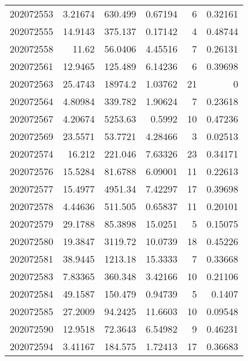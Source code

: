 \begin{tabular}{rrrrrr}
 202072553 &          3.21674 &      630.499  &            0.67194 &           6 & 0.32161 \\
 202072555 &         14.9143  &      375.137  &            0.17142 &           4 & 0.48744 \\
 202072558 &         11.62    &       56.0406 &            4.45516 &           7 & 0.26131 \\
 202072561 &         12.9465  &      125.489  &            6.14236 &           6 & 0.39698 \\
 202072563 &         25.4743  &    18974.2    &            1.03762 &          21 & 0       \\
 202072564 &          4.80984 &      339.782  &            1.90624 &           7 & 0.23618 \\
 202072567 &          4.20674 &     5253.63   &            0.5992  &          10 & 0.47236 \\
 202072569 &         23.5571  &       53.7721 &            4.28466 &           3 & 0.02513 \\
 202072574 &         16.212   &      221.046  &            7.63326 &          23 & 0.34171 \\
 202072576 &         15.5284  &       81.6788 &            6.09001 &          11 & 0.22613 \\
 202072577 &         15.4977  &     4951.34   &            7.42297 &          17 & 0.39698 \\
 202072578 &          4.44636 &      511.505  &            0.65837 &          11 & 0.20101 \\
 202072579 &         29.1788  &       85.3898 &           15.0251  &           5 & 0.15075 \\
 202072580 &         19.3847  &     3119.72   &           10.0739  &          18 & 0.45226 \\
 202072581 &         38.9445  &     1213.18   &           15.3333  &           7 & 0.33668 \\
 202072583 &          7.83365 &      360.348  &            3.42166 &          10 & 0.21106 \\
 202072584 &         49.1587  &      150.479  &            0.94739 &           5 & 0.1407  \\
 202072585 &         27.2009  &       94.2425 &           11.6603  &          10 & 0.09548 \\
 202072590 &         12.9518  &       72.3643 &            6.54982 &           9 & 0.46231 \\
 202072594 &          3.41167 &      184.575  &            1.72413 &          17 & 0.36683 \\

\end{tabular}
